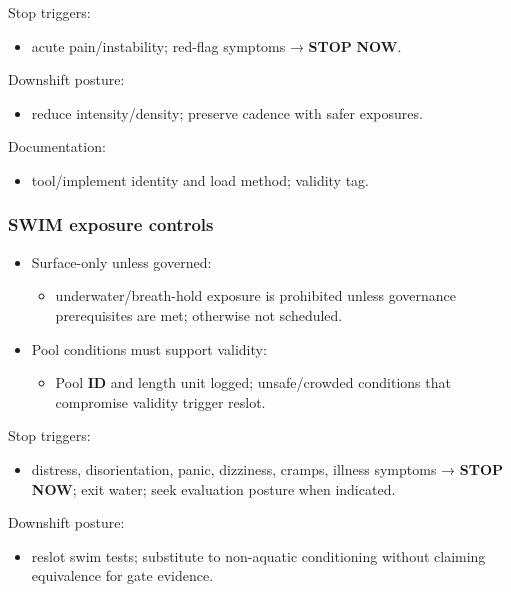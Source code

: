 \documentclass[10pt]{article}
\begin{document}
Stop triggers:

\begin{itemize}
\item acute pain/instability; red-flag symptoms → \textbf{STOP} \textbf{NOW}.
\end{itemize}

Downshift posture:

\begin{itemize}
\item reduce intensity/density; preserve cadence with safer exposures.
\end{itemize}

Documentation:

\begin{itemize}
\item tool/implement identity and load method; validity tag.
\end{itemize}

\subsubsection*{\textbf{SWIM} exposure controls}

\begin{itemize}
\item Surface-only unless governed:
\begin{itemize}
\item underwater/breath-hold exposure is prohibited unless governance prerequisites are met; otherwise not scheduled.
\end{itemize}
\item Pool conditions must support validity:
\begin{itemize}
\item Pool \textbf{ID} and length unit logged; unsafe/crowded conditions that compromise validity trigger reslot.
\end{itemize}
\end{itemize}

Stop triggers:

\begin{itemize}
\item distress, disorientation, panic, dizziness, cramps, illness symptoms → \textbf{STOP} \textbf{NOW}; exit water; seek evaluation posture when indicated.
\end{itemize}

Downshift posture:

\begin{itemize}
\item reslot swim tests; substitute to non-aquatic conditioning without claiming equivalence for gate evidence.
\end{itemize}
\end{document}
